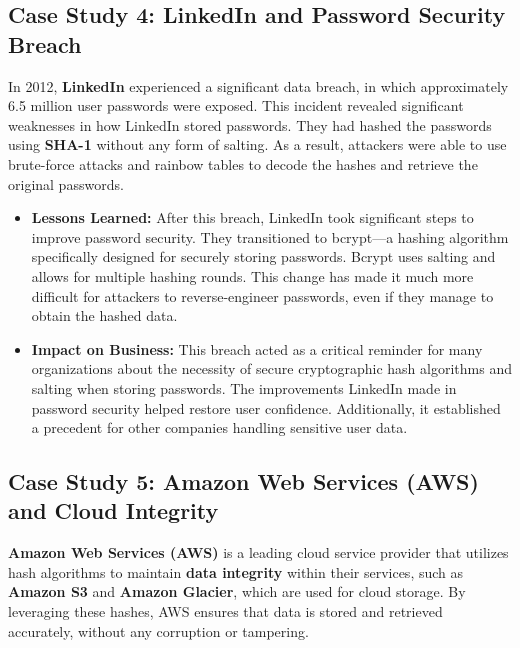 \documentclass[11pt,a4paper]{article}
\begin{document}
    \subsection*{Case Study 4: LinkedIn and Password Security Breach}
    In 2012, \textbf{LinkedIn} experienced a significant data breach, in which approximately 6.5 million user passwords were exposed. This incident revealed significant weaknesses in how LinkedIn stored passwords. They had hashed the passwords using \textbf{SHA-1} without any form of salting. As a result, attackers were able to use brute-force attacks and rainbow tables to decode the hashes and retrieve the original passwords.
        \begin{itemize}
            \item \textbf{Lessons Learned:}
            \newline
            After this breach, LinkedIn took significant steps to improve password security. They transitioned to bcrypt—a hashing algorithm specifically designed for securely storing passwords. Bcrypt uses salting and allows for multiple hashing rounds. This change has made it much more difficult for attackers to reverse-engineer passwords, even if they manage to obtain the hashed data.

            \item \textbf{Impact on Business:}
            \newline
            This breach acted as a critical reminder for many organizations about the necessity of secure cryptographic hash algorithms and salting when storing passwords. The improvements LinkedIn made in password security helped restore user confidence. Additionally, it established a precedent for other companies handling sensitive user data.

        \end{itemize}

    \subsection*{Case Study 5: Amazon Web Services (AWS) and Cloud Integrity}
    \textbf{Amazon Web Services (AWS)} is a leading cloud service provider that utilizes hash algorithms to maintain \textbf{data integrity} within their services, such as \textbf{Amazon S3} and \textbf{Amazon Glacier}, which are used for cloud storage. By leveraging these hashes, AWS ensures that data is stored and retrieved accurately, without any corruption or tampering.
\end{document}
